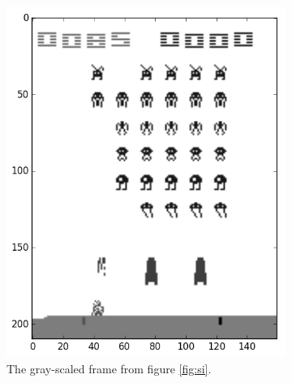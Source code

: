 \documentclass[11pt]{article}
\begin{document}
\begin{figure}[h!]
    \begin{subfigure}[t]{.5\textwidth}
        \centering
        \includegraphics[scale=0.35]{include/space_invaders_1_gray.png}
        \caption{The gray-scaled frame from figure \ref{fig:si}.}
        \label{fig:sig}
    \end{subfigure}
    \begin{subfigure}[t]{.5\textwidth}
        \centering

\end{subfigure}
\end{figure}
\end{document}

